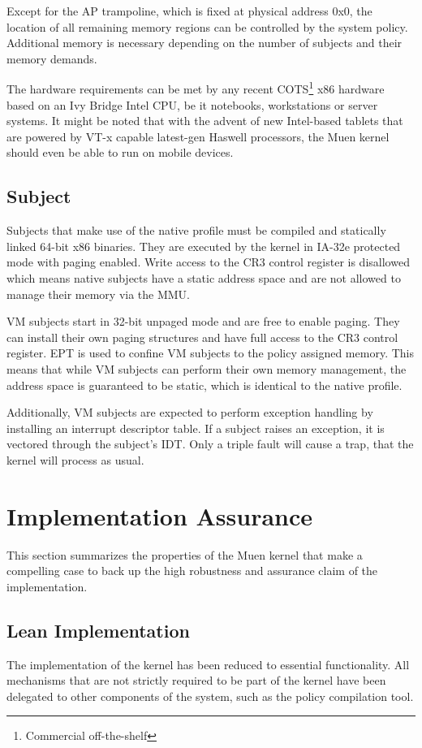 Except for the AP trampoline, which is fixed at physical address 0x0, the
location of all remaining memory regions can be controlled by the system policy.
Additional memory is necessary depending on the number of subjects and their
memory demands.

The hardware requirements can be met by any recent
COTS\footnote{Commercial off-the-shelf} x86 hardware based on an Ivy Bridge
Intel CPU, be it notebooks, workstations or server systems. It might be noted
that with the advent of new Intel-based tablets that are powered by VT-x capable
latest-gen Haswell processors, the Muen kernel should even be able to run on
mobile devices.

\subsection{Subject}
Subjects that make use of the native profile must be compiled and statically
linked 64-bit x86 binaries. They are executed by the kernel in IA-32e protected
mode with paging enabled. Write access to the CR3 control register is disallowed
which means native subjects have a static address space and are not allowed to
manage their memory via the MMU.

VM subjects start in 32-bit unpaged mode and are free to enable paging. They can
install their own paging structures and have full access to the CR3 control
register. EPT is used to confine VM subjects to the policy assigned memory. This
means that while VM subjects can perform their own memory management, the
address space is guaranteed to be static, which is identical to the native
profile.

Additionally, VM subjects are expected to perform exception handling by
installing an interrupt descriptor table. If a subject raises an exception, it
is vectored through the subject's IDT. Only a triple fault will cause a trap,
that the kernel will process as usual.

\section{Implementation Assurance}\label{sec:impl-assurance}
This section summarizes the properties of the Muen kernel that make a compelling
case to back up the high robustness and assurance claim of the implementation.

\subsection{Lean Implementation}
The implementation of the kernel has been reduced to essential functionality.
All mechanisms that are not strictly required to be part of the kernel have been
delegated to other components of the system, such as the policy compilation
tool.

